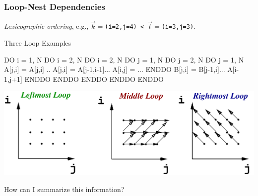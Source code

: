 \documentclass{beamer}
\newcommand{\emp}[1]{\textcolor{DikuRed}{ #1}}
\begin{document}
\begin{frame}[fragile,t]
  \frametitle{Loop-Nest Dependencies} %

{\em Lexicographic ordering}, 
e.g., {\tt$\vec{k}=$(i=2,j=4) < $\vec{l}=$(i=3,j=3)}.

\begin{block}{Three Loop Examples}
\begin{colorcode}
DO i = 1, N            DO i = 2, N               DO i = 2, N
 DO j = 1, N            DO j = 2, N               DO j = 1, N 
   A[j,i] = A[j,i] ..     A[j,i] = A[j-1,i-1]...   A[i,j] = ...
 ENDDO                    B[j,i] = B[j-1,i]...       A[i-1,j+1]
ENDDO                  ENDDO ENDDO               ENDDO ENDDO
\end{colorcode}
\end{block} 
\pause

\hspace{-5ex}\includegraphics[height=20ex]{img/day2/LoopDeps}  

\emp{How can I summarize this information?} %
\end{frame}
\end{document}

